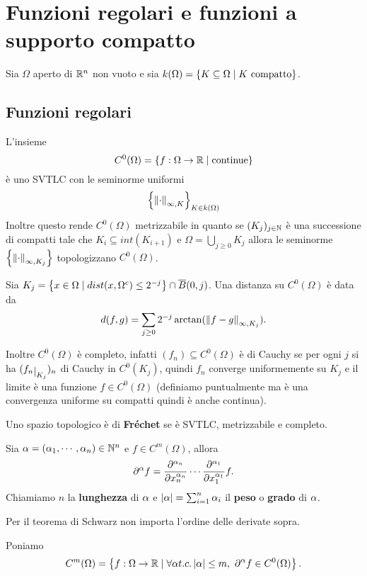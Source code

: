 \chapter{Funzioni regolari e funzioni a supporto compatto}

Sia $\Omega$ aperto di $\mathbb{R}^n$ non vuoto e sia $k(\Omega)=\left\{{K\subseteq \Omega\mid K\text{ compatto}}\right\}$. 

\section{Funzioni regolari}
L'insieme
\[C^0(\Omega)=\left\{{f:\Omega\to\mathbb{R}\mid \text{continue}}\right\}\]
\`e uno SVTLC con le seminorme uniformi
\[\left\{{{\left\Vert{\cdot}\right\Vert}_{\infty,K}}\right\}_{K\in k(\Omega)}\]
Inoltre questo rende $C^0(\Omega)$ metrizzabile in quanto se $(K_j)_{j\in\mathbb{N}}$ \`e una successione di compatti tale che $K_i\subseteq int(K_{i+1})$ e $\Omega=\bigcup_{j\geq 0}K_j$ allora le seminorme $\left\{{{\left\Vert{\cdot}\right\Vert}_{\infty,K_j}}\right\}$ topologizzano $C^0(\Omega)$.

\begin{example}
Sia $K_j=\left\{{x\in\Omega\mid dist(x,\Omega^c)\leq 2^{-j}}\right\}\cap \overline{B}(0,j)$. Una distanza su $C^0(\Omega)$ \`e data da
\[d(f,g)=\sum_{j\geq 0}2^{-j}\arctan(\left\Vert{f-g}\right\Vert_{\infty,K_j}).\]
\end{example}

Inoltre $C^0(\Omega)$ \`e completo, infatti $(f_n)\subseteq C^0(\Omega)$ \`e di Cauchy se per ogni $j$ si ha $(f_n\res{K_j})_n$ di Cauchy in $C^0(K_j)$, quindi $f_n$ converge uniformemente su $K_j$ e il limite \`e una funzione $f\in C^0(\Omega)$ (definiamo puntualmente ma \`e una convergenza uniforme su compatti quindi \`e anche continua).

\begin{definition}
Uno spazio topologico \`e di \textbf{Fr\'echet} se \`e SVTLC, metrizzabile e completo.
\end{definition}

\begin{notation}
Sia $\alpha=(\alpha_1,\cdots, \alpha_n)\in \mathbb{N}^n$ e $f\in C^m(\Omega)$, allora
\[\del^\al f=\pp[\al_n]{x_n^{\al_n}}{}\cdots \pp[\al_1]{x_1^{\al_1}}{} f.\]
Chiamiamo $n$ la \textbf{lunghezza} di $\alpha$ e $\left|{\alpha}\right|=\sum_{i=1}^n\alpha_i$ il \textbf{peso} o \textbf{grado} di $\alpha$.

Per il teorema di Schwarz non importa l'ordine delle derivate sopra.
\end{notation}

\begin{definition}
Poniamo
\[C^m(\Omega)=\left\{{f:\Omega\to \mathbb{R}\mid\forall \alpha t.c. \left|{\alpha}\right|\leq m,\  \partial^\alpha f\in C^0(\Omega)}\right\}.\]
\end{definition}

